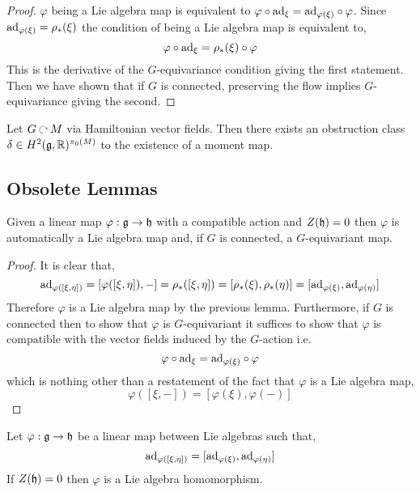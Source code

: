 \documentclass[12pt]{extarticle}
\begin{document}
\begin{proof}
$\varphi$ being a Lie algebra map is equivalent to $\varphi \circ \mathrm{ad}_{\xi} = \mathrm{ad}_{\varphi(\xi)} \circ \varphi$. Since $\mathrm{ad}_{\varphi(\xi)} = \rho_*(\xi)$ the condition of being a Lie algebra map is equivalent to,
\[ \varphi \circ \mathrm{ad}_{\xi} = \rho_*(\xi) \circ \varphi \]
This is the derivative of the $G$-equivariance condition giving the first statement. Then we have shown that if $G$ is connected, preserving the flow implies $G$-equivariance giving the second.
\end{proof}

\begin{cor}
Let $G \acts M$ via Hamiltonian vector fields. Then there exists an obstruction class $\delta \in H^2(\mathfrak{g}, \mathbb{R})^{\pi_0(M)}$ to the existence of a moment map.
\end{cor}

\subsection{Obsolete Lemmas}

\begin{lemma}
Given a linear map $\varphi : \mathfrak{g} \to \mathfrak{h}$ with a compatible action and $Z(\mathfrak{h}) = 0$ then $\varphi$ is automatically a Lie algebra map and, if $G$ is connected, a $G$-equivariant map.
\end{lemma}

\begin{proof}
It is clear that,
\[ \mathrm{ad}_{\varphi([\xi, \eta])} = [\varphi([\xi, \eta]), -] = \rho_*([\xi, \eta]) = [\rho_*(\xi), \rho_*(\eta)] = [\mathrm{ad}_{\varphi(\xi)}, \mathrm{ad}_{\varphi(\eta)}] \]
Therefore $\varphi$ is a Lie algebra map by the previous lemma. Furthermore, if $G$ is connected then to show that $\varphi$ is $G$-equivariant it suffices to show that $\varphi$ is compatible with the vector fields induced by the $G$-action i.e.
\[ \varphi \circ \mathrm{ad}_{\xi} = \mathrm{ad}_{\varphi(\xi)} \circ \varphi \]
which is nothing other than a restatement of the fact that $\varphi$ is a Lie algebra map,
\[ \varphi([\xi, -]) = [\varphi(\xi), \varphi(-)] \]
\end{proof}

\begin{lemma}
Let $\varphi : \mathfrak{g} \to \mathfrak{h}$ be a linear map between Lie algebras such that,
\[ \mathrm{ad}_{\varphi([\xi, \eta])} = [\mathrm{ad}_{\varphi(\xi)}, \mathrm{ad}_{\varphi(\eta)}] \]
If $Z(\mathfrak{h}) = 0$ then $\varphi$ is a Lie algebra homomorphism. 
\end{lemma}
\end{document}
